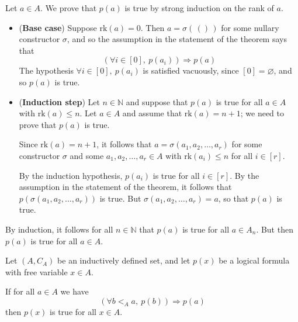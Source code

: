 \begin{cproof}
Let $a \in A$. We prove that $p(a)$ is true by strong induction on the rank of $a$.
\begin{itemize}
\item (\textbf{Base case}) Suppose $\mathrm{rk}(a) = 0$. Then $a = \sigma(\,()\,)$ for some nullary constructor $\sigma$, and so the assumption in the statement of the theorem says that
\[ (\forall i \in [0],~p(a_i)) \Rightarrow p(a) \]
The hypothesis $\forall i \in [0],~p(a_i)$ is satisfied vacuously, since $[0] = \varnothing$, and so $p(a)$ is true.

\item (\textbf{Induction step}) Let $n \in \mathbb{N}$ and suppose that $p(a)$ is true for all $a \in A$ with $\mathrm{rk}(a) \le n$. Let $a \in A$ and assume that $\mathrm{rk}(a) = n+1$; we need to prove that $p(a)$ is true.

Since $\mathrm{rk}(a) = n+1$, it follows that $a = \sigma(a_1,a_2,\dots,a_r)$ for some constructor $\sigma$ and some $a_1,a_2,\dots,a_r \in A$ with $\mathrm{rk}(a_i) \le n$ for all $i \in [r]$.

By the induction hypothesis, $p(a_i)$ is true for all $i \in [r]$. By the assumption in the statement of the theorem, it follows that $p(\sigma(a_1,a_2,\dots,a_r))$ is true. But $\sigma(a_1,a_2,\dots,a_r) = a$, so that $p(a)$ is true.
\end{itemize}

By induction, it follows for all $n \in \mathbb{N}$ that $p(a)$ is true for all $a \in A_n$. But then $p(a)$ is true for all $a \in A$.
\end{cproof}

\todo{}

\begin{example}

\end{example}

\todo{}

\begin{definition}
\end{definition}

\todo{}

\begin{theorem}
Let $(A, C_A)$ be an inductively defined set, and let $p(x)$ be a logical formula with free variable $x \in A$.

If for all $a \in A$ we have
\[ (\forall b <_A a,~ p(b)) \Rightarrow p(a) \]
then $p(x)$ is true for all $x \in A$.
\end{theorem}

